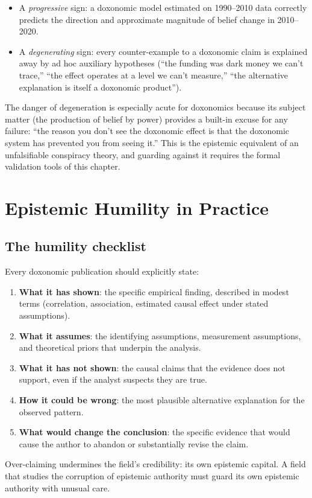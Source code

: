 \begin{itemize}[nosep]
  \item A \emph{progressive} sign: a doxonomic model estimated on 1990--2010 data correctly predicts the direction and approximate magnitude of belief change in 2010--2020.
  \item A \emph{degenerating} sign: every counter-example to a doxonomic claim is explained away by ad hoc auxiliary hypotheses (``the funding was dark money we can't trace,'' ``the effect operates at a level we can't measure,'' ``the alternative explanation is itself a doxonomic product'').
\end{itemize}

The danger of degeneration is especially acute for doxonomics because its subject matter (the production of belief by power) provides a built-in excuse for any failure: ``the reason you don't see the doxonomic effect is that the doxonomic system has prevented you from seeing it.''
This is the epistemic equivalent of an unfalsifiable conspiracy theory, and guarding against it requires the formal validation tools of this chapter.

\section{Epistemic Humility in Practice}
\label{sec:ch20-humility}

\subsection{The humility checklist}

\begin{principle}
\label{prin:humility}
Every doxonomic publication should explicitly state:
\begin{enumerate}[nosep]
  \item \textbf{What it has shown}: the specific empirical finding, described in modest terms (correlation, association, estimated causal effect under stated assumptions).
  \item \textbf{What it assumes}: the identifying assumptions, measurement assumptions, and theoretical priors that underpin the analysis.
  \item \textbf{What it has not shown}: the causal claims that the evidence does not support, even if the analyst suspects they are true.
  \item \textbf{How it could be wrong}: the most plausible alternative explanation for the observed pattern.
  \item \textbf{What would change the conclusion}: the specific evidence that would cause the author to abandon or substantially revise the claim.
\end{enumerate}
Over-claiming undermines the field's credibility: its own epistemic capital.
A field that studies the corruption of epistemic authority must guard its own epistemic authority with unusual care.
\end{principle}

